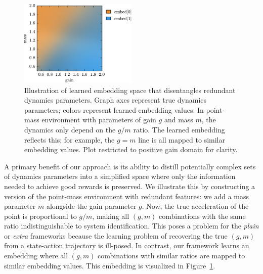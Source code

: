 \documentclass{article}
\newcommand{\TODO}[1]{\textcolor{red}{\textbf{TODO: #1}}}
\newcommand{\plain}{\emph{plain}}
\newcommand{\extra}{\emph{extra}}
\begin{document}
\begin{figure}
\centering
\includegraphics[width=0.5\textwidth]{embed_colors.pdf}
\caption{
Illustration of learned embedding space that disentangles redundant dynamics parameters.
Graph axes represent true dynamics parameters; colors represent learned embedding values.
In point-mass environment with parameters of gain $g$ and mass $m$,
the dynamics only depend on the $g/m$ ratio.
The learned embedding reflects this; for example, the $g=m$ line is all mapped to similar embedding values.
Plot restricted to positive gain domain for clarity.
}
\label{fig:embed_colors}
\end{figure}
A primary benefit of our approach is its ability to distill potentially complex sets of dynamics parameters
into a simplified space where only the information needed to achieve good rewards is preserved.
We illustrate this by constructing a version of the point-mass environment with redundant features:
we add a mass parameter $m$ alongside the gain parameter $g$.
Now, the true acceleration of the point is proportional to $g/m$,
making all $(g, m)$ combinations with the same ratio indistinguishable to system identification.
This poses a problem for the \plain{} or \extra{} frameworks
because the learning problem of recovering the true $(g, m)$ from a state-action trajectory is ill-posed.
In contrast, our framework learns an embedding where all $(g, m)$ combinations with similar ratios are mapped to similar embedding values.
This embedding is visualized in Figure~\ref{fig:embed_colors}.

\end{document}
